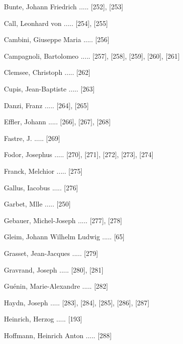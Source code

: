 \documentclass[twocolumn, 12pt]{book}
\begin{document}
\newline 
Bunte, Johann Friedrich ..... [252], [253]

\newline 
Call, Leonhard von ..... [254], [255]

\newline 
Cambini, Giuseppe Maria ..... [256]

\newline 
Campagnoli, Bartolomeo ..... [257], [258], [259], [260], [261]

\newline 
Clemsee, Christoph ..... [262]

\newline 
Cupis, Jean-Baptiste ..... [263]

\newline 
Danzi, Franz ..... [264], [265]

\newline 
Effler, Johann ..... [266], [267], [268]

\newline 
Fastre, J. ..... [269]

\newline 
Fodor, Josephus ..... [270], [271], [272], [273], [274]

\newline 
Franck, Melchior ..... [275]

\newline 
Gallus, Iacobus ..... [276]

\newline 
Garbet, Mlle ..... [250]

\newline 
Gebauer, Michel-Joseph ..... [277], [278]

\newline 
Gleim, Johann Wilhelm Ludwig ..... [65]

\newline 
Grasset, Jean-Jacques ..... [279]

\newline 
Gravrand, Joseph ..... [280], [281]

\newline 
Guénin, Marie-Alexandre ..... [282]

\newline 
Haydn, Joseph ..... [283], [284], [285], [286], [287]

\newline 
Heinrich, Herzog ..... [193]

\newline 
Hoffmann, Heinrich Anton ..... [288]
\end{document}
